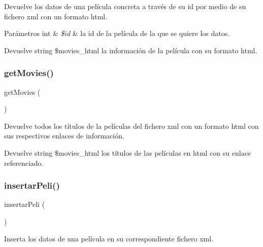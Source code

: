 Devuelve los datos de una película concreta a través de su id por medio de su fichero xml con un formato html.


\begin{DoxyParams}[1]{Parámetros}
int & {\em \$id} & la id de la película de la que se quiere los datos.\\
\hline
\end{DoxyParams}
\begin{DoxyReturn}{Devuelve}
string \$movies\+\_\+html la información de la película con su formato html. 
\end{DoxyReturn}
\mbox{\label{server_manager_8php_af16c238f2a71b7a08ff95871ae64c825}} 
\subsubsection{\texorpdfstring{getMovies()}{getMovies()}}
{\footnotesize\ttfamily get\+Movies (\begin{DoxyParamCaption}{ }\end{DoxyParamCaption})}

Devuelve todos los títulos de la películas del fichero xml con un formato html con sus respectivos enlaces de información.

\begin{DoxyReturn}{Devuelve}
string \$movies\+\_\+html los títulos de las películas en html con su enlace referenciado. 
\end{DoxyReturn}
\mbox{\label{server_manager_8php_aea99533bc26bc9f13ff095ef792636ea}} 
\subsubsection{\texorpdfstring{insertarPeli()}{insertarPeli()}}
{\footnotesize\ttfamily insertar\+Peli (\begin{DoxyParamCaption}{ }\end{DoxyParamCaption})}

Inserta los datos de una película en su correspondiente fichero xml.


